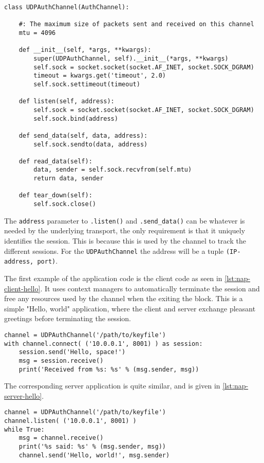 \begin{lstlisting}[caption=UDPAuthChannel Code, label=udp-auth-channel]
class UDPAuthChannel(AuthChannel):

    #: The maximum size of packets sent and received on this channel
    mtu = 4096

    def __init__(self, *args, **kwargs):
        super(UDPAuthChannel, self).__init__(*args, **kwargs)
        self.sock = socket.socket(socket.AF_INET, socket.SOCK_DGRAM)
        timeout = kwargs.get('timeout', 2.0)
        self.sock.settimeout(timeout)

    def listen(self, address):
        self.sock = socket.socket(socket.AF_INET, socket.SOCK_DGRAM)
        self.sock.bind(address)

    def send_data(self, data, address):
        self.sock.sendto(data, address)

    def read_data(self):
        data, sender = self.sock.recvfrom(self.mtu)
        return data, sender

    def tear_down(self):
        self.sock.close()
\end{lstlisting}

The \texttt{address} parameter to \texttt{.listen()} and \texttt{.send\_data()} can be whatever is needed by the underlying transport, the only requirement is that it uniquely identifies the session. This is because this is used by the channel to track the different sessions. For the \texttt{UDPAuthChannel} the address will be a tuple \texttt{(IP-address, port)}.

The first example of the application code is the client code as seen in \autoref{lst:nap-client-hello}. It uses context managers to automatically terminate the session and free any resources used by the channel when the exiting the block. This is a simple "Hello, world" application, where the client and server exchange pleasant greetings before terminating the session.

\begin{lstlisting}[caption=NAP Client Code, label=lst:nap-client-hello]
channel = UDPAuthChannel('/path/to/keyfile')
with channel.connect( ('10.0.0.1', 8001) ) as session:
    session.send('Hello, space!')
    msg = session.receive()
    print('Received from %s: %s' % (msg.sender, msg))
\end{lstlisting}

The corresponding server application is quite similar, and is given in \autoref{lst:nap-server-hello}.

\begin{lstlisting}[caption=NAP Server Code, label=lst:nap-server-hello]
channel = UDPAuthChannel('/path/to/keyfile')
channel.listen( ('10.0.0.1', 8001) )
while True:
    msg = channel.receive()
    print('%s said: %s' % (msg.sender, msg))
    channel.send('Hello, world!', msg.sender)
\end{lstlisting}\label{code:nuts-server}

